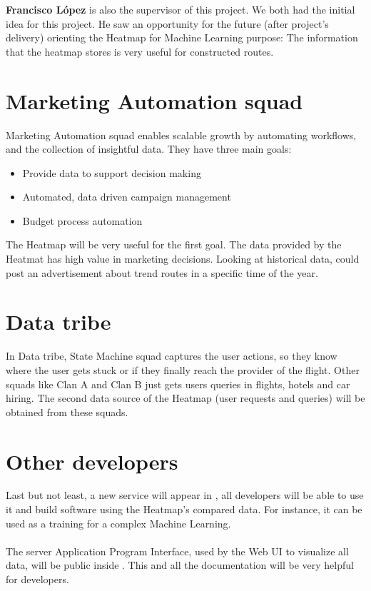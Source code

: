 \textbf{Francisco López} is also the supervisor of this project. We both had the initial idea for this project. He saw an opportunity for the future (after project's delivery) orienting the Heatmap for Machine Learning purpose: The information that the heatmap stores is very useful for constructed routes.

\section{Marketing Automation squad} \label{mas}

Marketing Automation squad enables scalable growth by automating workflows, and the collection of insightful data. They have three main goals:

\begin{itemize}
  \item Provide data to support decision making
  \item Automated, data driven campaign management
  \item Budget process automation
\end{itemize}

The Heatmap will be very useful for the first goal. The data provided by the Heatmat has high value in marketing decisions. Looking at historical data,  could post an advertisement about trend routes in a specific time of the year.

\section{Data tribe}

In Data tribe, State Machine squad captures the user actions, so they know where the user gets stuck or if they finally reach the provider of the flight. Other squads like Clan A and Clan B just gets users queries in flights, hotels and car hiring. The second data source of the Heatmap (user requests and queries) will be obtained from these squads.

\section{Other \company developers}

Last but not least, a new service will appear in \company, all developers will be able to use it and build software using the Heatmap's compared data. For instance, it can be used as a training for a complex Machine Learning\cite{machine_learning_coursera}.
\\\\
The server Application Program Interface, used by the Web UI to visualize all data, will be public inside \company. This and all the documentation will be very helpful for developers.

